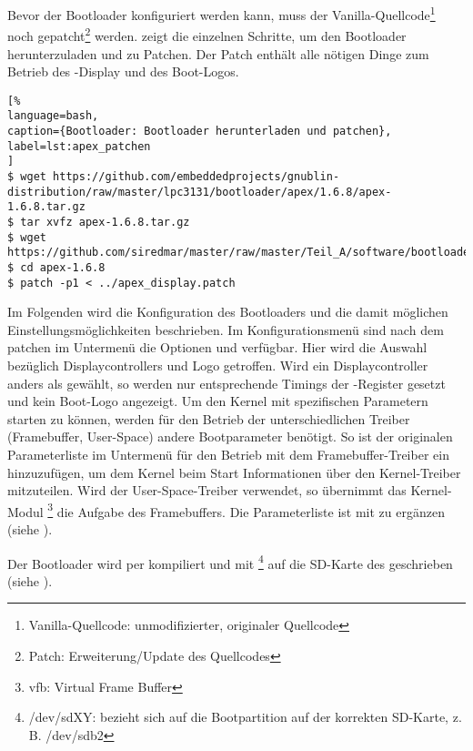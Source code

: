 Bevor der Bootloader konfiguriert werden kann, muss der Vanilla-Quellcode\footnote{Vanilla-Quellcode: unmodifizierter, originaler Quellcode} noch gepatcht\footnote{Patch: Erweiterung/Update des Quellcodes} werden.  zeigt die einzelnen Schritte, um den Bootloader herunterzuladen und zu Patchen. Der Patch enthält alle nötigen Dinge zum Betrieb des -Display und des Boot-Logos.

\begin{lstlisting}[%
language=bash,
caption={Bootloader: Bootloader herunterladen und patchen},
label=lst:apex_patchen
]
$ wget https://github.com/embeddedprojects/gnublin-distribution/raw/master/lpc3131/bootloader/apex/1.6.8/apex-1.6.8.tar.gz
$ tar xvfz apex-1.6.8.tar.gz
$ wget https://github.com/siredmar/master/raw/master/Teil_A/software/bootloader/apex_display.patch
$ cd apex-1.6.8
$ patch -p1 < ../apex_display.patch
\end{lstlisting}

Im Folgenden wird die Konfiguration des Bootloaders und die damit möglichen Einstellungsmöglichkeiten beschrieben. Im Konfigurationsmenü sind nach dem patchen im Untermenü  die Optionen  und  verfügbar. Hier wird die Auswahl bezüglich Displaycontrollers und Logo getroffen. Wird ein Displaycontroller anders als  gewählt, so werden nur entsprechende Timings der -Register gesetzt und kein Boot-Logo angezeigt. 
Um den Kernel mit spezifischen Parametern starten zu können, werden für den Betrieb der unterschiedlichen Treiber (Framebuffer, User-Space) andere Bootparameter benötigt. So ist der originalen Parameterliste  im Untermenü  für den Betrieb mit dem Framebuffer-Treiber ein  hinzuzufügen, um dem Kernel beim Start Informationen über den Kernel-Treiber  mitzuteilen. Wird der User-Space-Treiber verwendet, so übernimmt das Kernel-Modul \footnote{vfb: Virtual Frame Buffer} die Aufgabe des Framebuffers. Die Parameterliste ist mit  zu ergänzen (siehe \cite{LinuxKernelFBCON}).

Der Bootloader wird per  kompiliert und mit  \footnote{/dev/sdXY: bezieht sich auf die Bootpartition auf der korrekten SD-Karte, z. B. /dev/sdb2} auf die SD-Karte des  geschrieben (siehe \cite{GnublinWiki2013a}).

